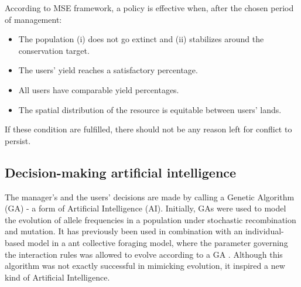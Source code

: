 \documentclass[12pt,a4paper]{article}
\begin{document}
%

According to MSE framework, a policy is effective when, after the chosen period of management: %
\begin{itemize}
    \item The population (i) does not go extinct and (ii) stabilizes around the conservation target.
    \item The users' yield reaches a satisfactory percentage.
    \item All users have comparable yield percentages.
    \item The spatial distribution of the resource is equitable between users' lands.
\end{itemize}
If these condition are fulfilled, there should not be any reason left for conflict to persist.

\subsection{Decision-making artificial intelligence}

The manager's and the users' decisions are made by calling a Genetic Algorithm (GA) - a form of Artificial Intelligence (AI).
Initially, GAs were used to model the evolution of allele frequencies in a population under stochastic recombination and mutation. %
It has previously been used in combination with an individual-based model in a ant collective foraging model, where the parameter governing the interaction rules was allowed to evolve according to a GA \citep{hamblin2013practical}. %
Although this algorithm was not exactly successful in mimicking evolution, it inspired a new kind of Artificial Intelligence.
\end{document}
